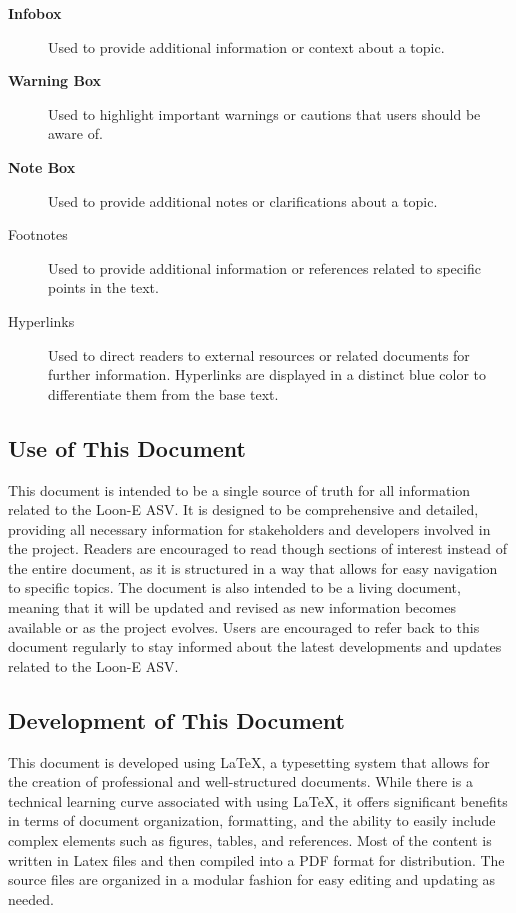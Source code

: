 \begin{description}
    \item[\textbf{Infobox}] Used to provide additional information or context about a topic.
    \item[\textbf{Warning Box}] Used to highlight important warnings or cautions that users should be aware of.
    \item[\textbf{Note Box}] Used to provide additional notes or clarifications about a topic.
    \item[Footnotes] Used to provide additional information or references related to specific points in the text.
    \item[Hyperlinks] Used to direct readers to external resources or related documents for further information. Hyperlinks are displayed in a distinct blue color to differentiate them from the base text.
\end{description}


\newpage %

\subsection{Use of This Document}
This document is intended to be a single source of truth for all information related to the Loon-E ASV. It is designed to be comprehensive and detailed, providing all necessary information for stakeholders and developers involved in the project.
Readers are encouraged to read though sections of interest instead of the entire document, as it is structured in a way that allows for easy navigation to specific topics.
The document is also intended to be a living document, meaning that it will be updated and revised as new information becomes available or as the project evolves.
Users are encouraged to refer back to this document regularly to stay informed about the latest developments and updates related to the Loon-E ASV.

\subsection{Development of This Document}
This document is developed using LaTeX, a typesetting system that allows for the creation of professional and well-structured documents.
While there is a technical learning curve associated with using LaTeX, it offers significant benefits in terms of document organization, formatting, and the ability to easily include complex elements such as figures, tables, and references.
Most of the content is written in Latex files and then compiled into a PDF format for distribution. The source files are organized in a modular fashion for easy editing and updating as needed.


